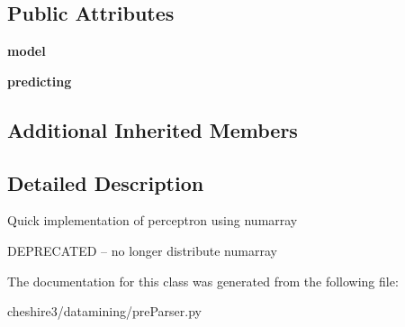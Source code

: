 \subsection*{Public Attributes}
\begin{DoxyCompactItemize}
\item 
\hypertarget{classcheshire3_1_1datamining_1_1pre_parser_1_1_perceptron_pre_parser_ad90e212c16a41c76eab9ff61a23d17ea}{{\bfseries model}}\label{classcheshire3_1_1datamining_1_1pre_parser_1_1_perceptron_pre_parser_ad90e212c16a41c76eab9ff61a23d17ea}

\item 
\hypertarget{classcheshire3_1_1datamining_1_1pre_parser_1_1_perceptron_pre_parser_af526fde2349496ddeca2262e19fadd67}{{\bfseries predicting}}\label{classcheshire3_1_1datamining_1_1pre_parser_1_1_perceptron_pre_parser_af526fde2349496ddeca2262e19fadd67}

\end{DoxyCompactItemize}
\subsection*{Additional Inherited Members}


\subsection{Detailed Description}
\begin{DoxyVerb}Quick implementation of perceptron using numarray

DEPRECATED -- no longer distribute numarray
\end{DoxyVerb}
 

The documentation for this class was generated from the following file\-:\begin{DoxyCompactItemize}
\item 
cheshire3/datamining/pre\-Parser.\-py\end{DoxyCompactItemize}
